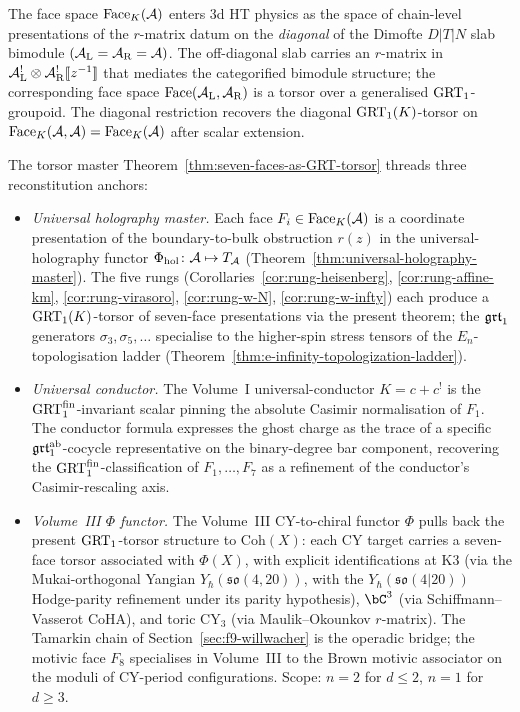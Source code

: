 \begin{remark}
\label{rem:grt-slab-bimodule-scope}
The face space $\mathrm{Face}_K(\mathcal{A})$ enters 3d HT physics as the space of
chain-level presentations of the $r$-matrix datum on the
\emph{diagonal} of the Dimofte $D|T|N$ slab bimodule
$(\mathcal{A}_{\mathrm{L}} = \mathcal{A}_{\mathrm{R}} = \mathcal{A})$. The off-diagonal slab
carries an $r$-matrix in
$\mathcal{A}_{\mathrm{L}}^{!}\otimes\mathcal{A}_{\mathrm{R}}^{!}[\![z^{-1}]\!]$ that
mediates the categorified bimodule structure; the corresponding
face space $\mathrm{Face}(\mathcal{A}_{\mathrm{L}}, \mathcal{A}_{\mathrm{R}})$ is a torsor
over a generalised $\mathrm{GRT}_1$-groupoid. The diagonal restriction
recovers the diagonal $\mathrm{GRT}_1(K)$-torsor on
$\mathrm{Face}_K(\mathcal{A}, \mathcal{A}) = \mathrm{Face}_K(\mathcal{A})$ after scalar extension.
\end{remark}

\begin{remark}
\label{rem:grt-climax-anchors}
The torsor master Theorem~\ref{thm:seven-faces-as-GRT-torsor}
threads three reconstitution anchors:
\begin{itemize}
\item[(a)] \emph{Universal holography master.} Each face
 $F_i \in \mathrm{Face}_K(\mathcal{A})$ is a coordinate presentation of the
 boundary-to-bulk obstruction $r(z)$ in the universal-holography
 functor $\Phi_{\mathrm{hol}}\colon \mathcal{A}\mapsto T_{\mathcal{A}}$
 (Theorem~\ref{thm:universal-holography-master}). The five rungs
 (Corollaries~\ref{cor:rung-heisenberg}, \ref{cor:rung-affine-km},
 \ref{cor:rung-virasoro}, \ref{cor:rung-w-N},
 \ref{cor:rung-w-infty}) each produce a $\mathrm{GRT}_1(K)$-torsor
 of seven-face presentations via the present theorem; the $\mathfrak{grt}_1$
 generators $\sigma_3, \sigma_5, \dots$ specialise to the higher-spin
 stress tensors of the $E_{n}$-topologisation ladder
 (Theorem~\ref{thm:e-infinity-topologization-ladder}).
\item[(b)] \emph{Universal conductor.} The Volume~I universal-conductor
 $K = c + c^{!}$ is the $\mathrm{GRT}_1^{\mathrm{fin}}$-invariant scalar
 pinning the absolute Casimir normalisation of $F_1$. The conductor
 formula expresses the ghost charge as the trace of a specific
 $\mathfrak{grt}_1^{\mathrm{ab}}$-cocycle representative on the binary-degree
 bar component, recovering the
 $\mathrm{GRT}_1^{\mathrm{fin}}$-classification of $F_1, \dots, F_7$ as a
 refinement of the conductor's Casimir-rescaling axis.
\item[(c)] \emph{Volume~III $\Phi$ functor.} The Volume~III
 CY-to-chiral functor $\Phi$ pulls back the present $\mathrm{GRT}_1$-torsor
 structure to $\mathrm{Coh}(X)$: each CY target carries a seven-face
 torsor associated with $\Phi(X)$, with explicit identifications at
 K3 (via the Mukai-orthogonal Yangian
 $Y_{\hbar}(\mathfrak{so}(4,20))$, with the
 $Y_{\hbar}(\mathfrak{so}(4|20))$ Hodge-parity refinement under its
 parity hypothesis), $\bC^{3}$
 (via Schiffmann--Vasserot CoHA), and toric CY${}_{3}$ (via
 Maulik--Okounkov $r$-matrix). The
 Tamarkin chain of Section~\ref{sec:f9-willwacher} is the operadic
 bridge; the motivic face $F_8$ specialises in Volume~III to the
 Brown motivic associator on the moduli of CY-period configurations.
 Scope: $n=2$ for $d\le 2$, $n=1$ for $d\ge 3$.
\end{itemize}
\end{remark}

